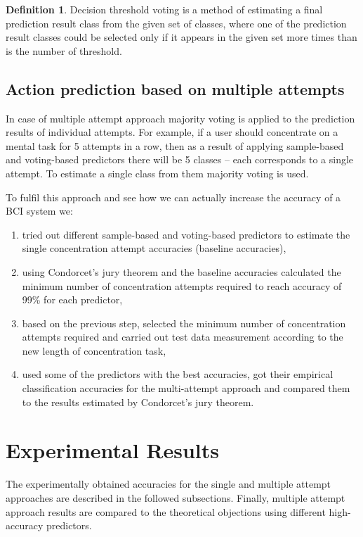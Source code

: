 \documentclass[12pt]{article}
\theoremstyle{definition}
\newtheorem{definition}{Definition}[section]
\begin{document}
\theoremstyle{definition}
\begin{definition}
Decision threshold voting is a method of estimating a final prediction result class from the given set of classes, where one of the prediction result classes could be selected only if it appears in the given set more times than is the number of threshold.
\end{definition}

\subsection{Action prediction based on multiple attempts}
In case of multiple attempt approach majority voting  is applied to the prediction results of individual attempts. For example, if a user should concentrate on a mental task for 5 attempts in a row, then as a result of applying sample-based and voting-based predictors there will be 5 classes -- each corresponds to a single attempt. To estimate a single class from them majority voting is used.

To fulfil this approach and see how we can actually increase the accuracy of a BCI system we:
\begin{enumerate}
\item tried out different sample-based and voting-based predictors to estimate the single concentration attempt accuracies (baseline accuracies),
\item using Condorcet's jury theorem and the baseline accuracies calculated the minimum number of concentration attempts required to reach accuracy of 99\% for each predictor,
\item based on the previous step, selected the minimum number of concentration attempts required and carried out test data measurement according to the new length of concentration task,
\item used some of the predictors with the best accuracies, got their empirical classification accuracies for the multi-attempt approach and compared them to the results estimated by Condorcet's jury theorem.
\end{enumerate}

\newpage
\section{Experimental Results}

The experimentally obtained accuracies for the single and multiple attempt approaches are described in the followed subsections. Finally, multiple attempt approach results are compared to the theoretical objections using different high-accuracy predictors.
\end{document}
